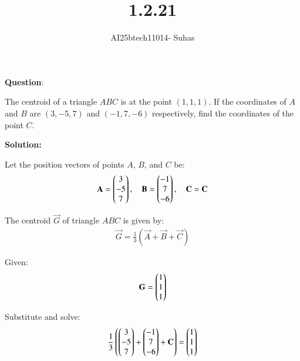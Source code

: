 \documentclass[journal]{IEEEtran}
\begin{document}


\title{1.2.21}
\author{AI25btech11014- Suhas}

{\let\newpage\relax\maketitle}

\renewcommand{\thefigure}{\theenumi}
\renewcommand{\thetable}{\theenumi}
\setlength{\intextsep}{10pt}

\renewcommand{\thetable}{\theenumi}





\textbf{Question}:\par
The centroid of a triangle $ABC$ is at the point $(1,1,1)$. If the coordinates of $A$ and $B$ are $(3,-5,7)$ and $(-1,7,-6)$ respectively, find the coordinates of the point $C$.


\vspace{1cm}

\textbf{Solution:}\\
\vspace{0.1cm}



Let the position vectors of points $A$, $B$, and $C$ be:
\begin{align}
\mathbf{A} = \begin{pmatrix}3\\-5\\7\end{pmatrix},\quad
\mathbf{B} = \begin{pmatrix}-1\\7\\-6\end{pmatrix},\quad
\mathbf{C} = \mathbf{C}
\end{align}

The centroid $\vec{G}$ of triangle $ABC$ is given by:
\begin{align}
\vec{G} = \frac{1}{3}(\vec{A} + \vec{B} + \vec{C})
\end{align}

Given:
\begin{align}
\mathbf{G} = \begin{pmatrix}1\\1\\1\end{pmatrix}
\end{align}

Substitute and solve:
\begin{align}
\frac{1}{3}\left(\begin{pmatrix}3\\-5\\7\end{pmatrix} + \begin{pmatrix}-1\\7\\-6\end{pmatrix} + \mathbf{C}\right) = \begin{pmatrix}1\\1\\1\end{pmatrix}
\end{align}
\end{document}
